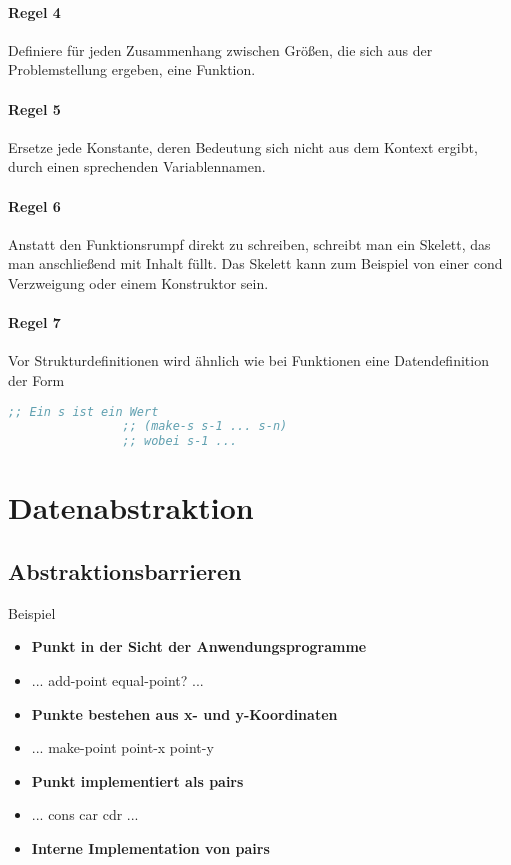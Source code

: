 \documentclass[../main.tex]{subfiles}
\begin{document}
        \paragraph{Regel 4}
            Definiere für jeden Zusammenhang zwischen Größen, die sich aus der Problemstellung ergeben, eine Funktion.
            
        \paragraph{Regel 5}
            Ersetze jede Konstante, deren Bedeutung sich nicht aus dem Kontext ergibt, durch einen sprechenden Variablennamen.
            
        \paragraph{Regel 6}
            Anstatt den Funktionsrumpf direkt zu schreiben, schreibt man ein Skelett, das man anschließend mit Inhalt füllt. Das Skelett kann zum Beispiel von einer cond Verzweigung oder einem Konstruktor sein.
            
        \paragraph{Regel 7}
            Vor Strukturdefinitionen wird ähnlich wie bei Funktionen eine Datendefinition der Form
            
            \begin{lstlisting}[language=Lisp]
                ;; Ein s ist ein Wert
                ;; (make-s s-1 ... s-n)
                ;; wobei s-1 ...
            \end{lstlisting}
            
    \section{Datenabstraktion}
        \subsection{Abstraktionsbarrieren}
            Beispiel 
            
            \begin{itemize}
                \item \textbf{Punkt in der Sicht der Anwendungsprogramme}
                \item ... add-point equal-point? ...
                \item \textbf{Punkte bestehen aus x- und y-Koordinaten}
                \item ... make-point point-x point-y
                \item \textbf{Punkt implementiert als pairs}
                \item ... cons car cdr ...
                \item \textbf{Interne Implementation von pairs}
            \end{itemize}
        
\end{document}
